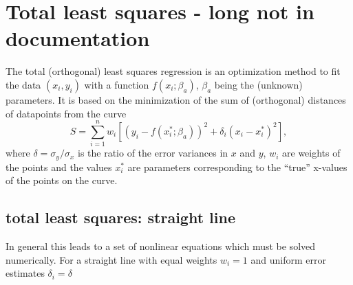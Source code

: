 \documentclass[a4paper,11pt,onepage]{article}
\begin{document}
 

%
%
\section{Total least squares - long not in documentation} \label{tls}
The total (orthogonal) least squares regression is an optimization method to fit the data $(x_i, y_i)$ with a function $f(x_i;\beta_a)$, $\beta_a$ being the (unknown) parameters.
It is based on the minimization of the sum of (orthogonal) distances of datapoints from the curve 
\begin{equation*}
 S = \sum_{i=1}^n w_i \left[(y_i - f(x_i^*; \beta_a))^2 + \delta_i (x_i - x_i^*)^2 \right],
\end{equation*} 
where $\delta = \sigma_{y}/\sigma_{x}$ is the ratio of the error variances in $x$ and $y$, $w_i$ are weights of the points and the values $x_i^*$ are parameters corresponding to the ``true'' x-values of the points on the curve. \\

\subsection{total least squares: straight line}
In general this leads to a set of nonlinear equations which must be solved numerically. For a straight line with equal weights $w_i=1$  and uniform error estimates $\delta_i = \delta$
\end{document}
